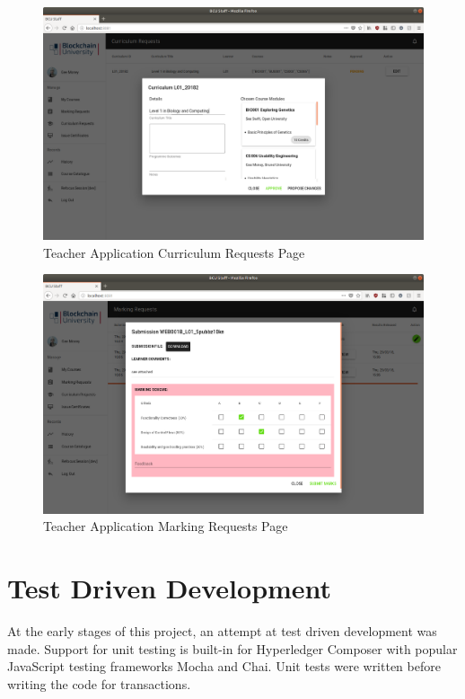 \begin{figure}[!ht]
	\centering
	\includegraphics[width=1.0\textwidth]{Teacher_approvecurr}
	\caption[Teacher Application Curriculum Requests Page]
	{Teacher Application Curriculum Requests Page}
	\label{fig:Teacher_approvecurr}
\end{figure}

\begin{figure}[!ht]
	\centering
	\includegraphics[width=1.0\textwidth]{Teacher_marking}
	\caption[Teacher Application Marking Requests Page]
	{Teacher Application Marking Requests Page}
	\label{fig:Teacher_marking}
\end{figure}

\clearpage
\section{Test Driven Development}

At the early stages of this project, an attempt at test driven development was made. 
Support for unit testing is built-in for Hyperledger Composer with popular JavaScript testing frameworks Mocha and Chai.
Unit tests were written before writing the code for transactions.

